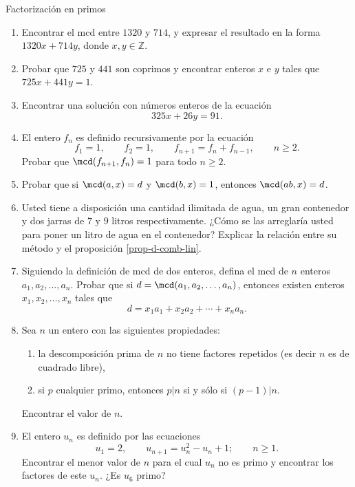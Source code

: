 \begin{section}{Factorización en primos}
\begin{enumerate}
    \item Encontrar el mcd entre $1320$ y $714$, y expresar el resultado en la forma $1320x+714y$, don\-de $x,y \in \mathbb Z$. 

    \item Probar que $725$ y $441$ son coprimos y encontrar enteros $x$ e $y$ tales que $725x+441y=1$.

    \item Encontrar una solución con números enteros de la ecuación
    $$ 325x+26y=91.$$

    \item El entero $f_n$ es definido recursivamente por la ecuación
    $$
    f_1=1,\qquad f_2=1, \qquad f_{n+1} = f_n + f_{n-1}, \qquad
    \text{$n\ge 2$}.
    $$
    Probar que $\mcd(f_{n+1},f_n)=1$ para todo $n\ge2$.

    \item Probar que si $\mcd(a,x)=d$ y $\mcd(b,x)=1$, entonces $\mcd(ab,x)=d$.

    \item Usted tiene a disposición una cantidad ilimitada de agua, un gran contenedor y dos jarras de $7$ y $9$ litros respectivamente. ¿Cómo se las arreglaría usted para poner un litro de agua en el contenedor? Explicar la relación entre su método y el proposición \ref{prop-d-comb-lin}.

    \item Siguiendo la definición de mcd de dos enteros, defina el mcd de $n$ enteros $a_1,a_2,\ldots,a_n$. Probar que si $d=\mcd(a_1,a_2,\ldots,a_n)$, entonces existen enteros $x_1,x_2,\ldots,x_n$ tales que
    $$
    d=x_1a_1+x_2a_2+\cdots+x_na_n.
    $$

    \item Sea $n$ un entero con las siguientes propiedades:  
    \begin{enumerate}
        \item  la descomposición prima de $n$ no tiene factores repetidos (es decir
        $n$ es de cuadrado libre), 
        \item si $p$ cualquier primo, entonces
        $p|n$ si  y sólo si $(p-1)|n$.
    \end{enumerate}
    Encontrar el valor de $n$.

    \item El entero $u_n$ es definido por las ecuaciones
    $$
    u_1=2,\qquad u_{n+1}=u_n^2-u_n+1;\qquad \text{$n\ge1$}.
    $$
    Encontrar el menor valor de $n$ para el cual $u_n$ no es primo y encontrar los factores de este $u_n$. ¿Es $u_6$ primo?


\end{enumerate}
\end{section}
